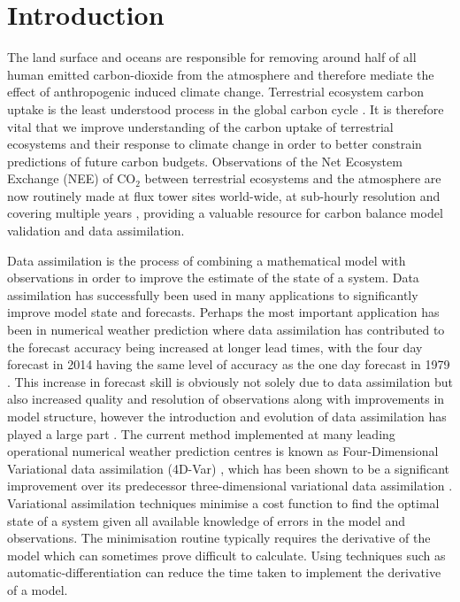 \documentclass[review]{elsarticle}
\begin{document}
\linenumbers

\section{Introduction} \label{sec:intro}

The land surface and oceans are responsible for removing around half of all human emitted carbon-dioxide from the atmosphere and therefore mediate the effect of anthropogenic induced climate change. Terrestrial ecosystem carbon uptake is the least understood process in the global carbon cycle \citep{ciais2014carbon}. It is therefore vital that we improve understanding of the carbon uptake of terrestrial ecosystems and their response to climate change in order to better constrain predictions of future carbon budgets. Observations of the Net Ecosystem Exchange (NEE) of CO$_{2}$ between terrestrial ecosystems and the atmosphere are now routinely made at flux tower sites world-wide, at sub-hourly resolution and covering multiple years \citep{baldocchi2008turner}, providing a valuable resource for carbon balance model validation and data assimilation.

Data assimilation is the process of combining a mathematical model with observations in order to improve the estimate of the state of a system. Data assimilation has successfully been used in many applications to significantly improve model state and forecasts. Perhaps the most important application has been in numerical weather prediction where data assimilation has contributed to the forecast accuracy being increased at longer lead times, with the four day forecast in 2014 having the same level of accuracy as the one day forecast in 1979 \citep{bauer2015quiet}. This increase in forecast skill is obviously not solely due to data assimilation but also increased quality and resolution of observations along with improvements in model structure, however the introduction and evolution of data assimilation has played a large part \citep{dee2011era}. The current method implemented at many leading operational numerical weather prediction centres is known as Four-Dimensional Variational data assimilation (4D-Var) \citep{QJ:QJ2652, QJ:QJ2054}, which has been shown to be a significant improvement over its predecessor three-dimensional variational data assimilation \citep{lorenc2005does}. Variational assimilation techniques minimise a cost function to find the optimal state of a system given all available knowledge of errors in the model and observations. The minimisation routine typically requires the derivative of the model which can sometimes prove difficult to calculate. Using techniques such as automatic-differentiation \citep{renaud1997automatic} can reduce the time taken to implement the derivative of a model. 
\end{document}
